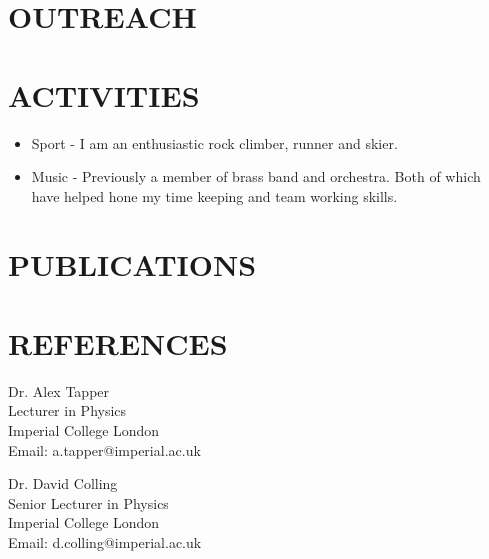 \documentclass[9pt]{res} %
\begin{document}
\begin{resume}
\section{OUTREACH}

\section{ACTIVITIES} 
\begin{itemize}
\item Sport - I am an enthusiastic rock climber, runner and skier.
\item Music - Previously a member of brass band and orchestra. Both of which have helped hone my time keeping and team working skills.
\end{itemize}

\section{PUBLICATIONS}



\section{REFERENCES}
\vspace{0.2cm}
\begin{minipage}[t]{0.5\textwidth}
Dr. Alex Tapper\\
Lecturer in Physics\\
Imperial College London\\
Email: a.tapper@imperial.ac.uk
\end{minipage}
\begin{minipage}[t]{0.5\textwidth}
Dr. David Colling\\
Senior Lecturer in Physics\\
Imperial College London\\
Email: d.colling@imperial.ac.uk
\end{minipage}

\end{resume}
\end{document}

